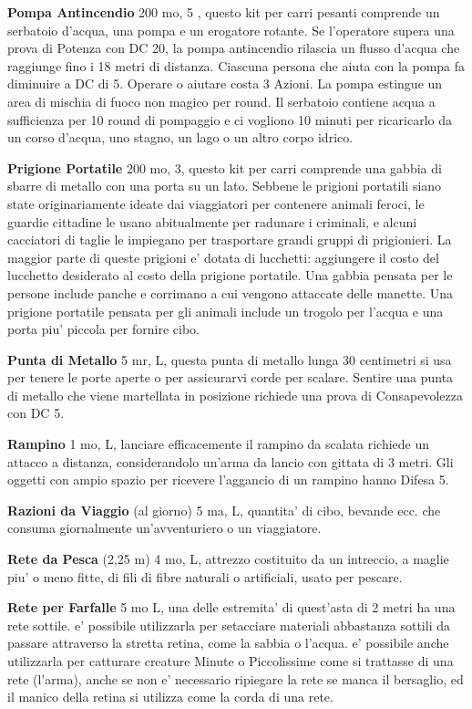 \documentclass[a4paper,11pt,twoside,openany]{book}
\begin{document}
{		\textbf{Pompa Antincendio} 200 mo, 5 , questo kit per carri pesanti comprende un serbatoio d'acqua, una pompa e un erogatore rotante. Se l'operatore supera una prova di Potenza con DC 20, la pompa antincendio rilascia un flusso d'acqua che raggiunge fino i 18 metri di distanza. Ciascuna persona che aiuta con la pompa fa diminuire a DC di 5. Operare o aiutare costa 3 Azioni. La pompa estingue un area di mischia di fuoco non magico per round. Il serbatoio contiene acqua a sufficienza per 10 round di pompaggio e ci vogliono 10 minuti per ricaricarlo da un corso d'acqua, uno stagno, un lago o un altro corpo idrico.
		
		\textbf{Prigione Portatile} 200 mo, 3, questo kit per carri comprende una gabbia di sbarre di metallo con una porta su un lato. Sebbene le prigioni portatili siano state originariamente ideate dai viaggiatori per contenere animali feroci, le guardie cittadine le usano abitualmente per radunare i criminali, e alcuni cacciatori di taglie le impiegano per trasportare grandi gruppi di prigionieri. La maggior parte di queste prigioni e' dotata di lucchetti: aggiungere il costo del lucchetto desiderato al costo della prigione portatile. Una gabbia pensata per le persone include panche e corrimano a cui vengono attaccate delle manette. Una prigione portatile pensata per gli animali include un trogolo per l'acqua e una porta piu' piccola per fornire cibo.
		
		\textbf{Punta di Metallo} 5 mr, L, questa punta di metallo lunga 30 centimetri si usa per tenere le porte aperte o per assicurarvi corde per scalare. Sentire una punta di metallo che viene martellata in posizione richiede una prova di Consapevolezza con DC 5.
		
		\textbf{Rampino} 1 mo, L, lanciare efficacemente il rampino da scalata richiede un attacco a distanza, considerandolo un'arma da lancio con gittata di 3 metri. Gli oggetti con ampio spazio per ricevere l'aggancio di un rampino hanno Difesa 5.
		
		\textbf{Razioni da Viaggio} (al giorno) 5 ma, L, quantita' di cibo, bevande ecc. che consuma giornalmente un'avventuriero o un viaggiatore.
		
		\textbf{Rete da Pesca} (2,25 m) 4 mo, L, attrezzo costituito da un intreccio, a maglie piu' o meno fitte, di fili di fibre naturali o artificiali, usato per pescare.
		
		\textbf{Rete per Farfalle} 5 mo L, una delle estremita' di quest'asta di 2 metri ha una rete sottile. e' possibile utilizzarla per setacciare materiali abbastanza sottili da passare attraverso la stretta retina, come la sabbia o l'acqua. e' possibile anche utilizzarla per catturare creature Minute o Piccolissime come si trattasse di una rete (l'arma), anche se non e' necessario ripiegare la rete se manca il bersaglio, ed il manico della retina si utilizza come la corda di una rete.
		
}
\end{document}
